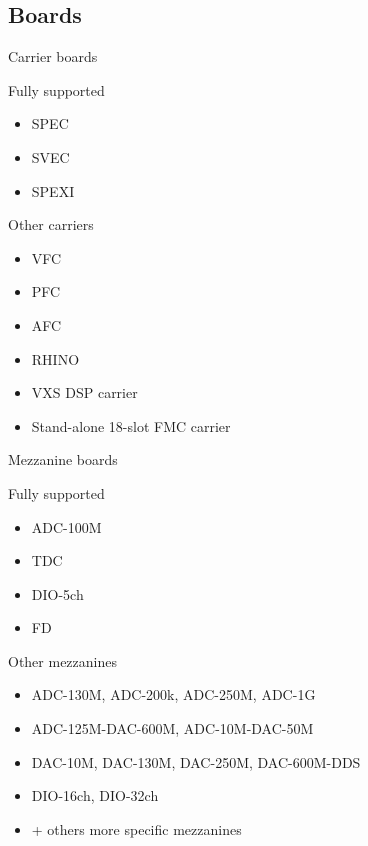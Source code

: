 \documentclass[compress,red]{beamer}
\begin{document}
\subsection{Boards}

\begin{frame}{Carrier boards}

  \begin{block}{Fully supported}
    \begin{itemize}
    \item
      SPEC
    \item
      SVEC
    \item
      SPEXI
    \end{itemize}
  \end{block}

  \begin{block}{Other carriers}
    \begin{itemize}
    \item
      VFC
    \item
      PFC
    \item
      AFC
    \item
      RHINO
    \item
      VXS DSP carrier
    \item
      Stand-alone 18-slot FMC carrier
    \end{itemize}
  \end{block}

\end{frame}

\begin{frame}{Mezzanine boards}

  \begin{block}{Fully supported}
    \begin{itemize}
    \item
      ADC-100M
    \item
      TDC
    \item
      DIO-5ch
    \item
      FD
    \end{itemize}
  \end{block}

  \begin{block}{Other mezzanines}
    \begin{itemize}
    \item
      ADC-130M, ADC-200k, ADC-250M, ADC-1G
    \item
      ADC-125M-DAC-600M, ADC-10M-DAC-50M
    \item
      DAC-10M, DAC-130M, DAC-250M, DAC-600M-DDS
    \item
      DIO-16ch, DIO-32ch
    \item
      + others more specific mezzanines
    \end{itemize}
  \end{block}

\end{frame}
\end{document}
